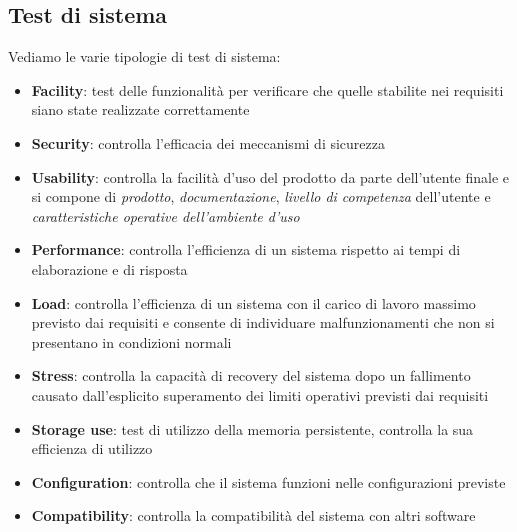 \subsection{Test di sistema}
Vediamo le varie tipologie di test di sistema:
\begin{itemize}
	\item \textbf{Facility}: test delle funzionalità per verificare che quelle stabilite nei requisiti siano state realizzate correttamente
	\item \textbf{Security}: controlla l'efficacia dei meccanismi di sicurezza
	\item \textbf{Usability}: controlla la facilità d'uso del prodotto da parte dell'utente finale e si compone di \textit{prodotto}, \textit{documentazione}, \textit{livello di competenza} dell'utente e \textit{caratteristiche operative dell'ambiente d'uso}
	\item \textbf{Performance}: controlla l'efficienza di un sistema rispetto ai tempi di elaborazione e di risposta
	\item \textbf{Load}: controlla l'efficienza di un sistema con il carico di lavoro massimo previsto dai requisiti e consente di individuare malfunzionamenti che non si presentano in condizioni normali
	\item \textbf{Stress}: controlla la capacità di recovery del sistema dopo un fallimento causato dall'esplicito superamento dei limiti operativi previsti dai requisiti
	\item \textbf{Storage use}: test di utilizzo della memoria persistente, controlla la sua efficienza di utilizzo
	\item \textbf{Configuration}: controlla che il sistema funzioni nelle configurazioni previste
	\item \textbf{Compatibility}: controlla la compatibilità del sistema con altri software
\end{itemize}